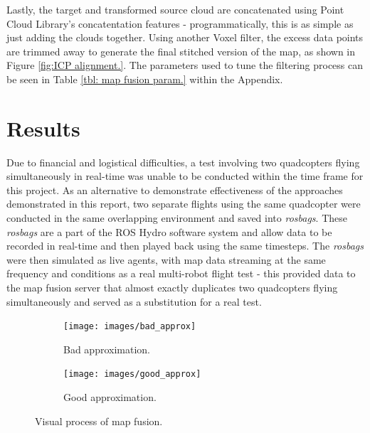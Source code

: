 \documentclass[letterpaper, oneside, 10pt]{report}
\begin{document}
    Lastly, the target and transformed source cloud are concatenated using Point Cloud Library's concatentation features - programmatically, this is as simple as just adding the clouds together. Using another Voxel filter, the excess data points are trimmed away to generate the final stitched version of the map, as shown in Figure \ref{fig:ICP alignment.}. The parameters used to tune the filtering process can be seen in Table \ref{tbl: map fusion param.} within the Appendix. \\

\section{Results}

Due to financial and logistical difficulties, a test involving two quadcopters flying simultaneously in real-time was unable to be conducted within the time frame for this project. As an alternative to demonstrate effectiveness of the approaches demonstrated in this report, two separate flights using the same quadcopter were conducted in the same overlapping environment and saved into \textsl{rosbags}. These \textsl{rosbags} are a part of the ROS Hydro software system and allow data to be recorded in real-time and then played back using the same timesteps. The \textsl{rosbags} were then simulated as live agents, with map data streaming at the same frequency and conditions as a real multi-robot flight test - this provided data to the map fusion server that almost exactly duplicates two quadcopters flying simultaneously and served as a substitution for a real test. \\

\begin{figure}[h]
    \centering
    \begin{subfigure}[h]{0.41\textwidth}
        \centering
        \texttt{[image: images/bad\_approx]}
        \caption{Bad approximation.}
        \label{fig: approx a.}
    \end{subfigure}
    \begin{subfigure}[h]{0.4\textwidth}
        \centering
        \texttt{[image: images/good\_approx]}
        \caption{Good approximation.}
        \label{fig: approx b.}
    \end{subfigure}
    \caption{Visual process of map fusion.}
    \label{fig: success and failure of map fusion.}
\end{figure}
\end{document}
